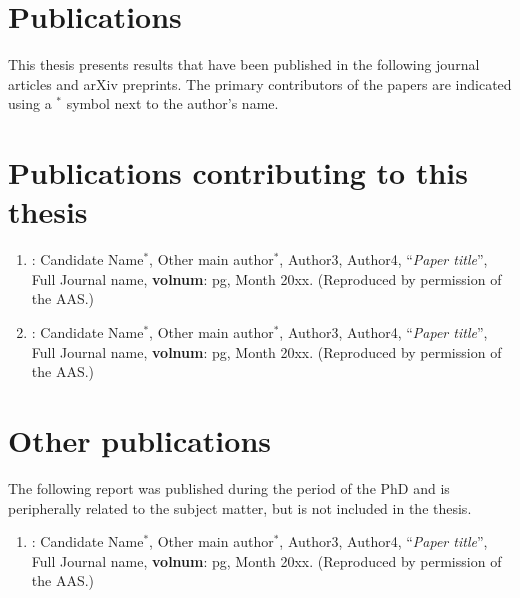 \thispagestyle{plain}
\section*{Publications}
This thesis presents results that have been published in the following journal
articles and arXiv preprints. The primary contributors of the papers are indicated
using a ${}^*$ symbol next to the author's name.

\section*{Publications contributing to this thesis}
\begin{enumerate}
  \item \cite{TestArticle-2022-ARAA}: {\color{denimdarkblue} Candidate Name}${}^*$, 
    Other main author${}^*$, Author3, Author4, 
    ``\emph{Paper title}'', Full Journal name, 
    \textbf{volnum}: pg, Month 20xx. (Reproduced by permission of the AAS.)

  \item \cite{TestArticle-2022-ARAA}: {\color{denimdarkblue} Candidate Name}${}^*$, 
    Other main author${}^*$, Author3, Author4, 
    ``\emph{Paper title}'', Full Journal name, 
    \textbf{volnum}: pg, Month 20xx. (Reproduced by permission of the AAS.)

\end{enumerate}

\section*{Other publications}
The following report was published during the period of the PhD and is 
peripherally related to the subject matter, but is not included in the thesis.
\begin{enumerate}
  \item \cite{TestArticle-2022-ARAA}: {\color{denimdarkblue} Candidate Name}${}^*$, 
    Other main author${}^*$, Author3, Author4, 
    ``\emph{Paper title}'', Full Journal name, 
    \textbf{volnum}: pg, Month 20xx. (Reproduced by permission of the AAS.)

\end{enumerate}

